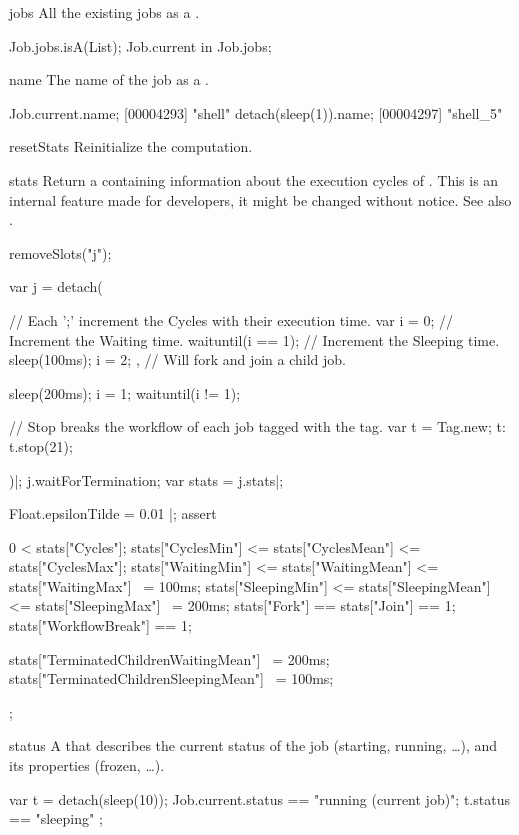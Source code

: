 \begin{urbiscriptapi}
\item[jobs]%
  All the existing jobs as a .
\begin{urbiassert}
Job.jobs.isA(List);
Job.current in Job.jobs;
\end{urbiassert}


\item[name] The name of the job as a .
\begin{urbiscript}
Job.current.name;
[00004293] "shell"
detach(sleep(1)).name;
[00004297] "shell_5"
\end{urbiscript}


\item[resetStats]%
  Reinitialize the  computation.


\item[stats]%
  Return a  containing information about the execution
  cycles of \urbi.  This is an internal feature made for developers, it
  might be changed without notice.  See also .
\begin{urbicomment}
removeSlots("j");
\end{urbicomment}
\begin{urbiscript}
var j = detach({
  // Each ';' increment the Cycles with their execution time.
  var i = 0;
  {
    // Increment the Waiting time.
    waituntil(i == 1);
    // Increment the Sleeping time.
    sleep(100ms);
    i = 2;
  }, // Will fork and join a child job.

  sleep(200ms);
  i = 1;
  waituntil(i != 1);

  // Stop breaks the workflow of each job tagged with the tag.
  var t = Tag.new;
  t: t.stop(21);
})|;
j.waitForTermination;
var stats = j.stats|;

Float.epsilonTilde = 0.01 |;
assert
{
  0 < stats["Cycles"];
  stats["CyclesMin"] <= stats["CyclesMean"] <= stats["CyclesMax"];
  stats["WaitingMin"] <= stats["WaitingMean"] <= stats["WaitingMax"] ~= 100ms;
  stats["SleepingMin"] <= stats["SleepingMean"] <= stats["SleepingMax"] ~= 200ms;
  stats["Fork"] == stats["Join"] == 1;
  stats["WorkflowBreak"] == 1;

  stats["TerminatedChildrenWaitingMean"] ~= 200ms;
  stats["TerminatedChildrenSleepingMean"] ~= 100ms;
};
\end{urbiscript}


\item[status] A  that describes the current status of the
  job (starting, running, \ldots), and its properties (frozen, \ldots).
\begin{urbiassert}
var t = detach(sleep(10));
Job.current.status == "running (current job)";
t.status == "sleeping" ;
\end{urbiassert}



\end{urbiscriptapi}
